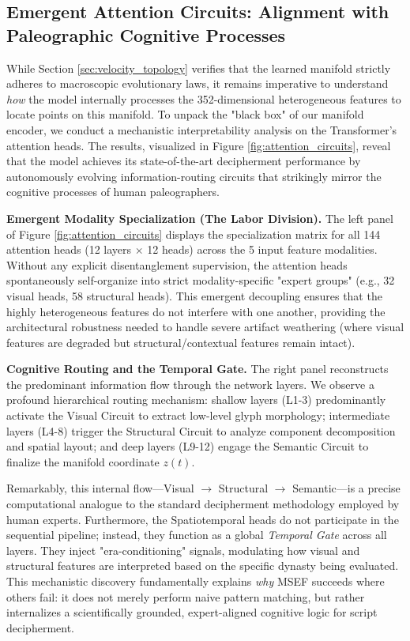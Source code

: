 \documentclass{article}
\begin{document}
\subsection{Emergent Attention Circuits: Alignment with Paleographic Cognitive Processes}
\label{sec:attention_circuits}

While Section \ref{sec:velocity_topology} verifies that the learned manifold strictly adheres to macroscopic evolutionary laws, it remains imperative to understand \textit{how} the model internally processes the 352-dimensional heterogeneous features to locate points on this manifold. To unpack the "black box" of our manifold encoder, we conduct a mechanistic interpretability analysis on the Transformer's attention heads. The results, visualized in Figure \ref{fig:attention_circuits}, reveal that the model achieves its state-of-the-art decipherment performance by autonomously evolving information-routing circuits that strikingly mirror the cognitive processes of human paleographers.

\textbf{Emergent Modality Specialization (The Labor Division).} 
The left panel of Figure \ref{fig:attention_circuits} displays the specialization matrix for all 144 attention heads (12 layers $\times$ 12 heads) across the 5 input feature modalities. Without any explicit disentanglement supervision, the attention heads spontaneously self-organize into strict modality-specific "expert groups" (e.g., 32 visual heads, 58 structural heads). This emergent decoupling ensures that the highly heterogeneous features do not interfere with one another, providing the architectural robustness needed to handle severe artifact weathering (where visual features are degraded but structural/contextual features remain intact).

\textbf{Cognitive Routing and the Temporal Gate.} 
The right panel reconstructs the predominant information flow through the network layers. We observe a profound hierarchical routing mechanism: shallow layers (L1-3) predominantly activate the Visual Circuit to extract low-level glyph morphology; intermediate layers (L4-8) trigger the Structural Circuit to analyze component decomposition and spatial layout; and deep layers (L9-12) engage the Semantic Circuit to finalize the manifold coordinate $z(t)$. 

Remarkably, this internal flow—Visual $\rightarrow$ Structural $\rightarrow$ Semantic—is a precise computational analogue to the standard decipherment methodology employed by human experts. Furthermore, the Spatiotemporal heads do not participate in the sequential pipeline; instead, they function as a global \textit{Temporal Gate} across all layers. They inject "era-conditioning" signals, modulating how visual and structural features are interpreted based on the specific dynasty being evaluated. This mechanistic discovery fundamentally explains \textit{why} MSEF succeeds where others fail: it does not merely perform naive pattern matching, but rather internalizes a scientifically grounded, expert-aligned cognitive logic for script decipherment.
\end{document}
